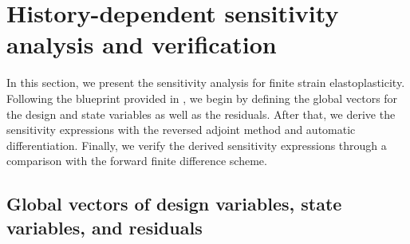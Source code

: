 \documentclass[preprint,11pt]{elsarticle}
\theoremstyle{definition}
\begin{document}
\section{History-dependent sensitivity analysis and verification}
\label{Sec: Sensitivity Analysis and Verification}

In this section, we present the sensitivity analysis for finite strain elastoplasticity. Following the blueprint provided in \citet{jia_multimaterial_2025}, we begin by defining the global vectors for the design and state variables as well as the residuals. After that, we derive the sensitivity expressions with the reversed adjoint method and automatic differentiation. Finally, we verify the derived sensitivity expressions through a comparison with the forward finite difference scheme.

\subsection{Global vectors of design variables, state variables, and residuals}
\end{document}
